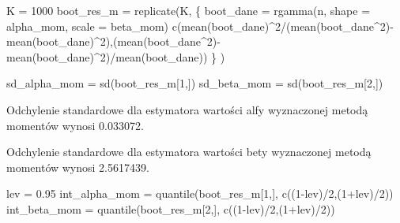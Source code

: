 \documentclass[
]{article}
\newenvironment{Shaded}{\begin{snugshade}}{\end{snugshade}}
\newcommand{\AttributeTok}[1]{\textcolor[rgb]{0.77,0.63,0.00}{#1}}
\newcommand{\DecValTok}[1]{\textcolor[rgb]{0.00,0.00,0.81}{#1}}
\newcommand{\FloatTok}[1]{\textcolor[rgb]{0.00,0.00,0.81}{#1}}
\newcommand{\FunctionTok}[1]{\textcolor[rgb]{0.00,0.00,0.00}{#1}}
\newcommand{\NormalTok}[1]{#1}
\newcommand{\OtherTok}[1]{\textcolor[rgb]{0.56,0.35,0.01}{#1}}
\newcommand{\SpecialCharTok}[1]{\textcolor[rgb]{0.00,0.00,0.00}{#1}}
\begin{document}
\begin{Shaded}
\begin{Highlighting}[]
\NormalTok{K }\OtherTok{=} \DecValTok{1000}
\NormalTok{boot\_res\_m }\OtherTok{=} \FunctionTok{replicate}\NormalTok{(K, \{}
\NormalTok{boot\_dane }\OtherTok{=} \FunctionTok{rgamma}\NormalTok{(n, }\AttributeTok{shape =}\NormalTok{ alpha\_mom, }\AttributeTok{scale =}\NormalTok{ beta\_mom)}
\FunctionTok{c}\NormalTok{(}\FunctionTok{mean}\NormalTok{(boot\_dane)}\SpecialCharTok{\^{}}\DecValTok{2}\SpecialCharTok{/}\NormalTok{(}\FunctionTok{mean}\NormalTok{(boot\_dane}\SpecialCharTok{\^{}}\DecValTok{2}\NormalTok{)}\SpecialCharTok{{-}}\FunctionTok{mean}\NormalTok{(boot\_dane)}\SpecialCharTok{\^{}}\DecValTok{2}\NormalTok{),(}\FunctionTok{mean}\NormalTok{(boot\_dane}\SpecialCharTok{\^{}}\DecValTok{2}\NormalTok{)}\SpecialCharTok{{-}}\FunctionTok{mean}\NormalTok{(boot\_dane)}\SpecialCharTok{\^{}}\DecValTok{2}\NormalTok{)}\SpecialCharTok{/}\FunctionTok{mean}\NormalTok{(boot\_dane))}
\NormalTok{\} )}

\NormalTok{sd\_alpha\_mom }\OtherTok{=} \FunctionTok{sd}\NormalTok{(boot\_res\_m[}\DecValTok{1}\NormalTok{,])}
\NormalTok{sd\_beta\_mom }\OtherTok{=} \FunctionTok{sd}\NormalTok{(boot\_res\_m[}\DecValTok{2}\NormalTok{,])}
\end{Highlighting}
\end{Shaded}

Odchylenie standardowe dla estymatora wartości alfy wyznaczonej metodą
momentów wynosi 0.033072.

Odchylenie standardowe dla estymatora wartości bety wyznaczonej metodą
momentów wynosi 2.5617439.

\begin{Shaded}
\begin{Highlighting}[]
\NormalTok{lev }\OtherTok{=} \FloatTok{0.95}
\NormalTok{int\_alpha\_mom }\OtherTok{=} \FunctionTok{quantile}\NormalTok{(boot\_res\_m[}\DecValTok{1}\NormalTok{,], }\FunctionTok{c}\NormalTok{((}\DecValTok{1}\SpecialCharTok{{-}}\NormalTok{lev)}\SpecialCharTok{/}\DecValTok{2}\NormalTok{,(}\DecValTok{1}\SpecialCharTok{+}\NormalTok{lev)}\SpecialCharTok{/}\DecValTok{2}\NormalTok{))}
\NormalTok{int\_beta\_mom }\OtherTok{=} \FunctionTok{quantile}\NormalTok{(boot\_res\_m[}\DecValTok{2}\NormalTok{,], }\FunctionTok{c}\NormalTok{((}\DecValTok{1}\SpecialCharTok{{-}}\NormalTok{lev)}\SpecialCharTok{/}\DecValTok{2}\NormalTok{,(}\DecValTok{1}\SpecialCharTok{+}\NormalTok{lev)}\SpecialCharTok{/}\DecValTok{2}\NormalTok{))}
\end{Highlighting}
\end{Shaded}
\end{document}
